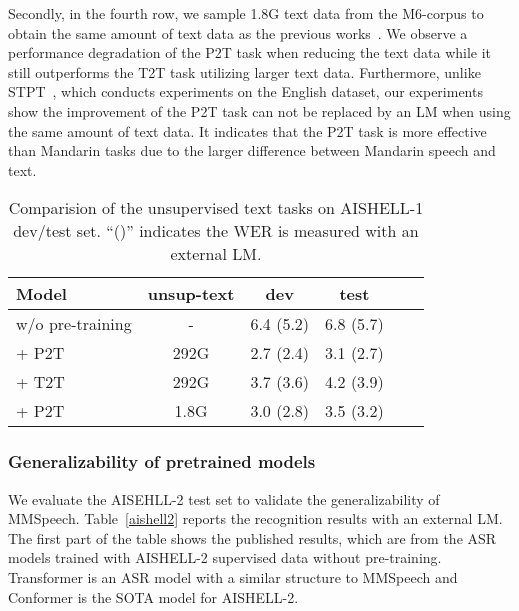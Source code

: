\documentclass{article}
\begin{document}
Secondly, in the fourth row, we sample 1.8G text data from the M6-corpus to obtain the same amount of text data as the previous works~\cite{ao2021speecht5, tang2022unified}. We observe a performance degradation of the P2T task when reducing the text data while it still outperforms the T2T task utilizing larger text data. Furthermore, unlike STPT~\cite{tang2022unified}, which conducts experiments on the English dataset, our experiments show the improvement of the P2T task can not be replaced by an LM when using the same amount of text data. It indicates that the P2T task is more effective than Mandarin tasks due to the larger difference between Mandarin speech and text.

\begin{table}[htb]
	\centering
	\caption{Comparision of the unsupervised text tasks on AISHELL-1 dev/test set. “()” indicates the WER is measured with an external LM.}
    \vspace{0.1cm}
    \label{unsup_text}
	\begin{tabular}{lccccc}
		\toprule  Model & unsup-text & dev & test \\
		\midrule  w/o pre-training & - & 6.4 (5.2) & 6.8 (5.7) \\
        + P2T         & 292G & 2.7 (2.4) & 3.1 (2.7) \\
        + T2T         & 292G & 3.7 (3.6) & 4.2 (3.9) \\
        + P2T         & 1.8G & 3.0 (2.8)   & 3.5 (3.2) \\
		\bottomrule  \end{tabular}
\end{table}


\subsubsection{Generalizability of pretrained models} 
We evaluate the AISEHLL-2 test set to validate the generalizability of MMSpeech. Table~\ref{aishell2} reports the recognition results with an external LM. The first part of the table shows the published results, which are from the ASR models trained with AISHELL-2 supervised data without pre-training. Transformer is an ASR model with a similar structure to MMSpeech and Conformer is the SOTA model for AISHELL-2. 
\end{document}
